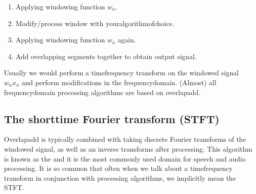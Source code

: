 \documentclass[letterpaper,10pt,english]{jupyterBook}
\begin{document}
\sphinxAtStartPar
{}
\begin{enumerate}
%
\item {} 
\sphinxAtStartPar
Applying windowing function \(w_n\).

\item {} 
\sphinxAtStartPar
Modify/process window with your\sphinxhyphen{}algorithm\sphinxhyphen{}of\sphinxhyphen{}choice.

\item {} 
\sphinxAtStartPar
Applying windowing function \(w_n\) again.

\item {} 
\sphinxAtStartPar
Add overlapping segments together to obtain output signal.

\end{enumerate}

\sphinxAtStartPar
Usually we would perform a time\sphinxhyphen{}frequency transform on the    windowed signal \(w_nx_n\) and perform modifications in the    frequency\sphinxhyphen{}domain. (Almost) all frequency\sphinxhyphen{}domain processing algorithms are based on  overlap\sphinxhyphen{}add.


\subsection{The short\sphinxhyphen{}time Fourier transform (STFT)}
\label{\detokenize{Representations/Short-time_processing:the-short-time-fourier-transform-stft}}
\sphinxAtStartPar
Overlap\sphinxhyphen{}add is typically combined with taking discrete Fourier transforms of the windowed signal, as well as an inverse transforms after processing. This algorithm is known as the  and it is the most commonly used domain for speech and audio processing. It is so common that often when we talk about a time\sphinxhyphen{}frequency transform in conjunction with processing algorithms, we implicitly mean the STFT.
\end{document}
